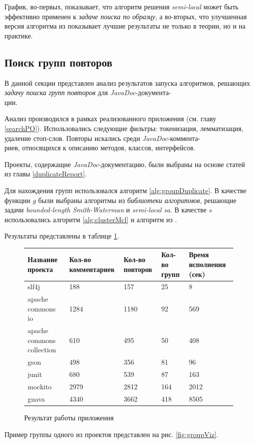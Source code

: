 График, во-первых, показывает, что алгоритм решения \emph{semi-local} может быть эффективно применен к \emph{задаче поиска по образцу}, а во-вторых, что улучшенная версия алгоритма из \cite{luciv2019interactive} показывает лучшие результаты не только в теории, но и на практике.

\subsection{Поиск групп повторов}
В данной секции представлен анализ результатов запуска алгоритмов, решающих  \emph{задачу поиска групп повторов} для \emph{JavaDoc}-документа-\\ции.

Анализ производился в рамках реализованного приложения (см. главу \ref{searchPO}).
Использовались следующие фильтры: токенизация, лемматизация, удаление стоп-слов.
Повторы искались среди \emph{JavaDoc}-коммента-\\риев, относящихся к описанию методов, классов, интерфейсов.

Проекты, содержащие \emph{JavaDoc}-документацию, были выбраны на основе статей из главы \ref{duplicateReport}.

Для нахождения групп использовался алгоритм \ref{alg:groupDuplicate}.
В качестве функции $g$ были выбраны алгоритмы из \emph{библиотеки алгоритмов}, решающие задачи \emph{bounded-length Smith-Waterman} и \emph{semi-local sa}.
В качестве $s$ использовались алгоритм \ref{alg:clusterMcl} и алгоритм из \cite{tofigh2009optimum}.

Результаты представлены в таблице \ref{table}.


\begin{figure}[h]

\begin{center}
 \begin{tabular}{ | p{3cm} | p{3cm} | p{3cm} | p{3cm} | p{3cm} |} 
 \hline
 Название  проекта & Кол-во  комментариев & Кол-во  повторов & Кол-во групп & Время исполнения (сек) \\
 \hline
  slf4j & 188 & 157 & 25 & 8 \\
  \hline
  apache commons io & 1284 & 1180 & 92 & 569 \\
  \hline
  apache commons collection & 610 &495 &50 & 408 \\
  \hline
  gson & 498 & 356 & 81 & 96 \\
  \hline junit & 680 & 539 & 87 & 163 \\
  \hline mockito & 2979 & 2812 & 164 & 2012\\
  \hline guava & 4340 & 3662 & 418 & 8505 \\
  \hline
\end{tabular}
\end{center}
\caption{Результат работы приложения}\label{table}
\end{figure}
Пример группы одного из проектов представлен на рис. \ref{fig:groupViz}.

